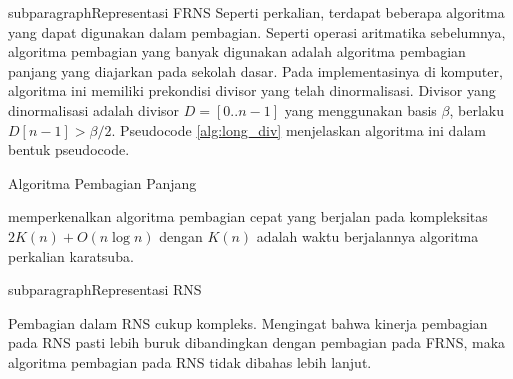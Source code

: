       subparagraph{Representasi FRNS}
      Seperti perkalian, terdapat beberapa algoritma yang dapat digunakan dalam pembagian. Seperti operasi aritmatika sebelumnya, algoritma pembagian yang banyak digunakan adalah algoritma pembagian panjang yang diajarkan pada sekolah dasar. Pada implementasinya di komputer, algoritma ini memiliki prekondisi divisor yang telah dinormalisasi. Divisor yang dinormalisasi adalah divisor $D = [0..n-1]$ yang menggunakan basis $\beta$, berlaku $D[n-1] > \beta/2$. Pseudocode \ref{alg:long_div} menjelaskan algoritma ini dalam bentuk pseudocode.

      \begin{algorithm}
        \caption{Algoritma Pembagian Panjang}
        \label{alg:long_div}
        \begin{algorithmic}[1]
          \Statex
          \Else
          \EndIf
          \EndWhile
          \State {}
          \EndFor
          \EndFunction
        \end{algorithmic}

      \end{algorithm}

      \citet{div_burnikel_ziegler} memperkenalkan algoritma pembagian cepat yang berjalan pada kompleksitas $2K(n)+O(n \log n)$ dengan $K(n)$ adalah waktu berjalannya algoritma perkalian karatsuba.

      subparagraph{Representasi RNS}

      Pembagian dalam RNS cukup kompleks. Mengingat bahwa kinerja pembagian pada RNS pasti lebih buruk dibandingkan dengan pembagian pada FRNS, maka algoritma pembagian pada RNS tidak dibahas lebih lanjut.
